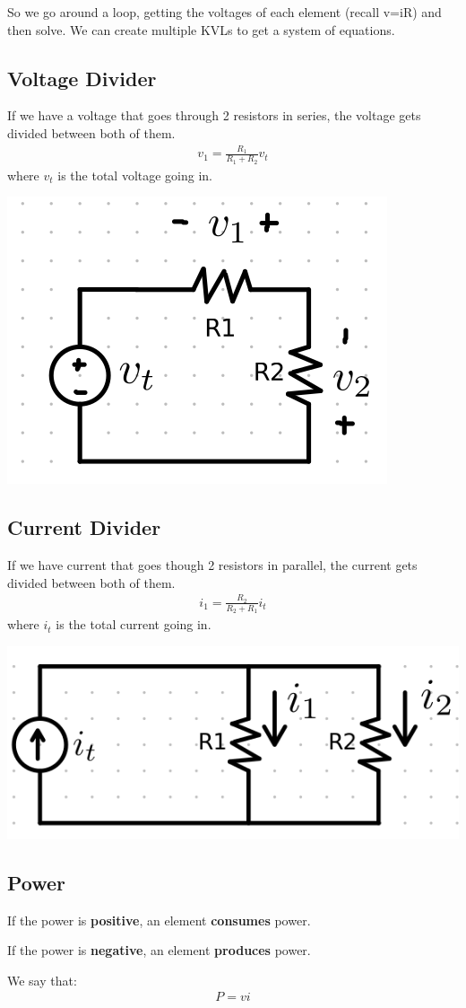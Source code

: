 \documentclass[12pt,letterpaper]{article} \usepackage{amsmath} \usepackage{graphicx} \usepackage[margin=1in]{geometry} \usepackage{longtable}  \usepackage{amssymb}
\begin{document}
	
	So we go around a loop, getting the voltages of each element (recall v=iR) and then solve. We can create multiple KVLs to get a system of equations.
	
	\subsection{Voltage Divider}
	If we have a voltage that goes through 2 resistors in series, the voltage gets divided between both of them.
	\begin{align*}
		v_1 = \frac{R_1}{R_1 + R_2} v_t
	\end{align*} 
	where $v_t$ is the total voltage going in.
	\begin{center}
		\includegraphics[width=0.3\linewidth]{voltagediv}
	\end{center}
	
	
	\subsection{Current Divider}
	If we have current that goes though 2 resistors in parallel, the current gets divided between both of them. 
	\begin{align*}
		i_1 = \frac{R_2}{R_2+R_1}i_t
	\end{align*}
	where $i_t$ is the total current going in.
	\begin{center}
		\includegraphics[width=0.4\linewidth]{currentdiv}
	\end{center}

	\subsection{Power}
	If the power is \textbf{positive}, an element \textbf{consumes }power. 
	
	If the power is \textbf{negative}, an element \textbf{produces }power.
	
	We say that:
	\begin{align*}
		P=vi
	\end{align*}
\end{document}
